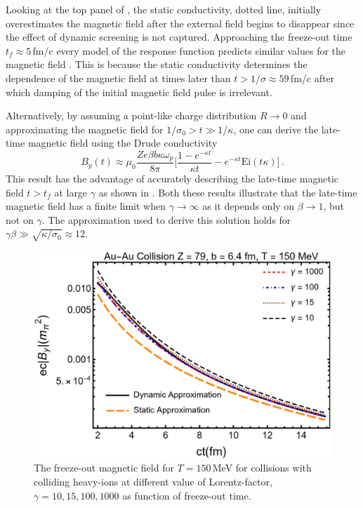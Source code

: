 Looking at the top panel of , the static conductivity, dotted line, initially overestimates the magnetic field after the external field begins to disappear since the effect of dynamic screening is not captured. Approaching the freeze-out time $t_f \approx 5\,$fm/c every model of the response function predicts similar values for the magnetic field \cite{Song:2007ux}. This is because the static conductivity determines the dependence of the magnetic field at times later than $t>1/\sigma \approx 59$\,fm/c after which damping of the initial magnetic field pulse is irrelevant. 

Alternatively, by assuming a point-like charge distribution $R\rightarrow 0$ and approximating the magnetic field for $ 1/\sigma_0 > t\gg 1/\kappa$, one can derive the late-time magnetic field using the Drude conductivity 
\begin{equation}\label{eq:latetimeB}
   B_y(t) \approx  \mu_0 \frac{ Ze \beta b \kappa \omega_p }{8\pi}\bigg[ \frac{1- e^{-\kappa t}}{\kappa t} - e^{-\kappa t} \text{Ei}\left(t\kappa\right)\bigg]\,.
\end{equation}
This result has the advantage of accurately describing the late-time magnetic field $t>t_f$  at large $\gamma$ as shown in . Both these results illustrate that the late-time magnetic field has a finite limit when $\gamma\rightarrow\infty$ as it depends only on $\beta\to 1$, but not on $\gamma$. The approximation used to derive this solution holds for $\gamma\beta \gg \sqrt{ \kappa/\sigma_0} \approx 12$. 

\begin{figure}
\centering
\includegraphics[width=0.85\linewidth]{plots/bfgaamacomp.png}
    \caption{The freeze-out magnetic field for $T= 150$\,MeV for collisions with colliding heavy-ions at different value of Lorentz-factor, $\gamma=10,15,100,1000$ as function of freeze-out time.   \label{fig:bcolcomp}}
\end{figure}

